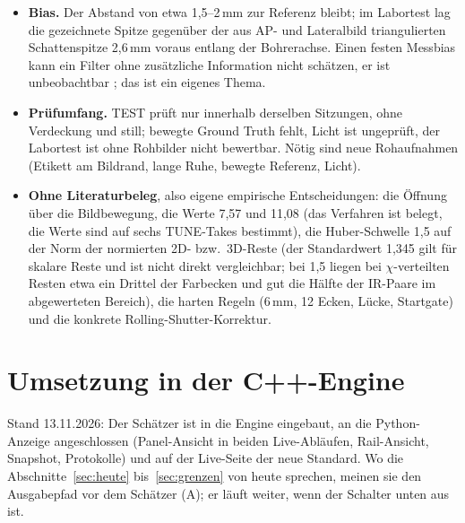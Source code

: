 \documentclass[11pt,a4paper,fleqn]{article}
\begin{document}
\begin{itemize}
        etwa 1,3\,mm weiter von der Referenz als die fusionierte Pose (Abschnitt~\ref{sec:ergebnis}); ungeklärt.
  \item \textbf{Bias.} Der Abstand von etwa 1,5--2\,mm zur Referenz bleibt; im Labortest lag die gezeichnete Spitze
        gegenüber der aus AP- und Lateralbild triangulierten Schattenspitze 2,6\,mm voraus entlang der Bohrerachse.
        Einen festen Messbias kann ein Filter ohne zusätzliche Information nicht schätzen, er ist unbeobachtbar
        \cite[§5.1.3]{barfoot2017state}; das ist ein eigenes Thema.
  \item \textbf{Prüfumfang.} TEST prüft nur innerhalb derselben Sitzungen, ohne Verdeckung und still; bewegte
        Ground Truth fehlt, Licht ist ungeprüft, der Labortest ist ohne Rohbilder nicht bewertbar. Nötig sind
        neue Rohaufnahmen (Etikett am Bildrand, lange Ruhe, bewegte Referenz, Licht).
  \item \textbf{Ohne Literaturbeleg}, also eigene empirische Entscheidungen: die Öffnung über die Bildbewegung,
        die Werte 7,57 und 11,08 (das Verfahren ist belegt, die Werte sind auf sechs TUNE-Takes bestimmt), die
        Huber-Schwelle 1,5 auf der Norm der normierten 2D- bzw.\ 3D-Reste (der Standardwert 1,345
        \cite[§9.4]{zhang1997parameter} gilt für skalare Reste und ist nicht direkt vergleichbar; bei 1,5 liegen bei
        $\chi$-verteilten Resten etwa ein Drittel der Farbecken und gut die Hälfte der IR-Paare im abgewerteten
        Bereich), die harten Regeln (6\,mm, 12 Ecken, Lücke, Startgate) und die konkrete
        Rolling-Shutter-Korrektur.
\end{itemize}

\section{Umsetzung in der C++-Engine}
\label{sec:cpp}

Stand 13.11.2026: Der Schätzer ist in die Engine eingebaut, an die Python-Anzeige angeschlossen (Panel-Ansicht in
beiden Live-Abläufen, Rail-Ansicht, Snapshot, Protokolle) und auf der Live-Seite der neue Standard. Wo die
Abschnitte~\ref{sec:heute} bis~\ref{sec:grenzen} von \glqq heute\grqq{} sprechen, meinen sie den Ausgabepfad vor dem
Schätzer (A); er läuft weiter, wenn der Schalter unten aus ist.
\end{document}
